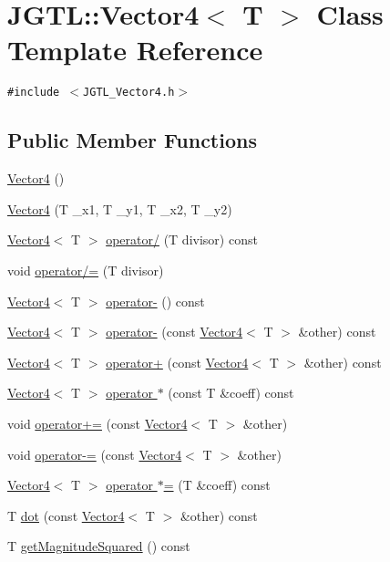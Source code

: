 \hypertarget{class_j_g_t_l_1_1_vector4}{
\section{JGTL::Vector4$<$ T $>$ Class Template Reference}
\label{class_j_g_t_l_1_1_vector4}
}
{\tt \#include $<$JGTL\_\-Vector4.h$>$}

\subsection*{Public Member Functions}
\begin{CompactItemize}
\item 
\hyperlink{class_j_g_t_l_1_1_vector4_310337a8c54f2aa03f2a551b778ddb62}{Vector4} ()
\item 
\hyperlink{class_j_g_t_l_1_1_vector4_98f3b4d9fe3e5b1718e48614d521194e}{Vector4} (T \_\-x1, T \_\-y1, T \_\-x2, T \_\-y2)
\item 
\hyperlink{class_j_g_t_l_1_1_vector4}{Vector4}$<$ T $>$ \hyperlink{class_j_g_t_l_1_1_vector4_020cb9f5ed100b9b10e2b1d81c7ca353}{operator/} (T divisor) const
\item 
void \hyperlink{class_j_g_t_l_1_1_vector4_cf745186ea3585257445f04d665c0bd1}{operator/=} (T divisor)
\item 
\hyperlink{class_j_g_t_l_1_1_vector4}{Vector4}$<$ T $>$ \hyperlink{class_j_g_t_l_1_1_vector4_c8ee2ad1d7134da444fbc25a9ef95571}{operator-} () const
\item 
\hyperlink{class_j_g_t_l_1_1_vector4}{Vector4}$<$ T $>$ \hyperlink{class_j_g_t_l_1_1_vector4_d79eb06d34969cd4d6f040369e288918}{operator-} (const \hyperlink{class_j_g_t_l_1_1_vector4}{Vector4}$<$ T $>$ \&other) const 
\item 
\hyperlink{class_j_g_t_l_1_1_vector4}{Vector4}$<$ T $>$ \hyperlink{class_j_g_t_l_1_1_vector4_fd278c01f6b1464d8c13e79050650229}{operator+} (const \hyperlink{class_j_g_t_l_1_1_vector4}{Vector4}$<$ T $>$ \&other) const 
\item 
\hyperlink{class_j_g_t_l_1_1_vector4}{Vector4}$<$ T $>$ \hyperlink{class_j_g_t_l_1_1_vector4_d829a0db976c6c476776323e33ef41d2}{operator $\ast$} (const T \&coeff) const 
\item 
void \hyperlink{class_j_g_t_l_1_1_vector4_0baae11e6bb4633d6bf005ecfde8425b}{operator+=} (const \hyperlink{class_j_g_t_l_1_1_vector4}{Vector4}$<$ T $>$ \&other)
\item 
void \hyperlink{class_j_g_t_l_1_1_vector4_4d5975ec045fa0041c4efe6fdbd5af93}{operator-=} (const \hyperlink{class_j_g_t_l_1_1_vector4}{Vector4}$<$ T $>$ \&other)
\item 
\hyperlink{class_j_g_t_l_1_1_vector4}{Vector4}$<$ T $>$ \hyperlink{class_j_g_t_l_1_1_vector4_b136b349aa9aa57e8179d02ba6798f0b}{operator $\ast$=} (T \&coeff) const
\item 
T \hyperlink{class_j_g_t_l_1_1_vector4_f58d72a4db1968d0096042faefbc999b}{dot} (const \hyperlink{class_j_g_t_l_1_1_vector4}{Vector4}$<$ T $>$ \&other) const 
\item 
T \hyperlink{class_j_g_t_l_1_1_vector4_dcf6515607880611c34686ed8f4d34d6}{get\-Magnitude\-Squared} () const
\end{CompactItemize}
